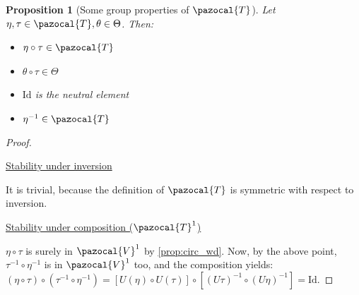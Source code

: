 \documentclass[english,a4paper,10pt,oneside]{scrbook}	%
\theoremstyle{break}
\newtheorem{prop}[equation]{Proposition}
\newenvironment{mproof}[1][\proofname]{%
  \begin{proof}[#1]$ $\par\nobreak\ignorespaces
}{%
  \end{proof}
}
\renewcommand*{\proofname}{Proof}
\theoremstyle{remark}
\newcommand{\mR}{\mathbb{R}}
\newcommand{\cV}{\pazocal{V}}
\newcommand{\cT}{\pazocal{T}}
\newcommand{\id}{\text{Id}}
\newcommand{\te}{\theta}
\newcommand{\Te}{\Theta}
\begin{document}
\begin{prop}[Some group properties of $\cT$]
\label{prop:group}
Let $\eta, \tau \in \cT, \te \in \Te$. Then:

\begin{itemize}
	\item $\eta \circ \tau \in \cT$
	\item $\te \circ \tau \in \Te$
	\item $\id$ is the neutral element
	\item $\eta^{-1} \in \cT$
\end{itemize}

\end{prop}
\begin{mproof}

%
%
%
%
%

\underline{Stability under inversion}

It is trivial, because the definition of $\cT$ is symmetric with respect to inversion.

\underline{Stability under composition ($\cT^1$)}

$\eta \circ \tau$ is surely in $\cV^1$ by \cref{prop:circ_wd}. Now, by the above point, $\tau^{-1} \circ \eta^{-1}$ is in $\cV^1$ too, and the composition yields: $(\eta \circ \tau)\circ (\tau^{-1} \circ \eta^{-1}) = [U(\eta)\circ U(\tau)]\circ [(U\tau)^{-1} \circ (U\eta)^{-1}] = \id$.

\end{mproof}
\end{document}
